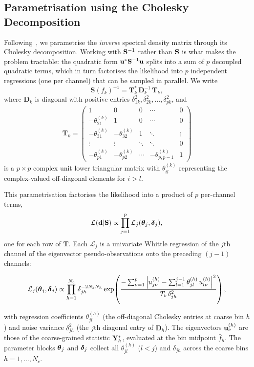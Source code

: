 \documentclass[%
	reprint,
	nofootinbib,
	amsmath,
	amssymb,
	aps,
]{revtex4-2}
\begin{document}
	\subsection{Parametrisation using the Cholesky Decomposition}
	Following~\citet{RosenOri2007Aeom,Hu2023}, we parametrise the
	\emph{inverse} spectral density matrix through its Cholesky decomposition.
	Working with $\S^{-1}$ rather than $\S$ is what makes the problem
	tractable: the quadratic form $\u^{*}\S^{-1}\u$ splits into a sum of $p$
	decoupled quadratic terms, which in turn factorises the likelihood into
	$p$ independent regressions (one per channel) that can be sampled in
	parallel. We write
	\begin{equation}
		\mathbf{S}(f_{k})^{-1}= \mathbf{T}_{k}^{*} \, \mathbf{D}_{k}^{-1}\, \mathbf{T}_{k},
	\end{equation}
	where $\mathbf{D}_{k}$ is diagonal with positive entries
	$\delta_{1k}^{2}, \delta_{2k}^{2}, \ldots, \delta_{pk}^{2}$, and
	\begin{align}
		\mathbf{T}_{k} = \begin{pmatrix}1&0&0&\cdots&0 \\ -\theta_{21}^{(k)}&1&0&\cdots&0 \\ -\theta_{31}^{(k)}&-\theta_{32}^{(k)}&1&\ddots&\vdots \\ \vdots&\vdots&\ddots&\ddots&0 \\ -\theta_{p1}^{(k)}&-\theta_{p2}^{(k)}&\cdots&-\theta_{p,p-1}^{(k)}&1\end{pmatrix}
	\end{align}
	is a $p \times p$ complex unit lower triangular matrix with
	$\theta_{il}^{(k)}$ representing the complex-valued off-diagonal elements for
	$i > l$.

	This parametrisation factorises the likelihood into a product of $p$
	per-channel terms,
	\begin{equation}
		\mathcal{L}(\d|\S) \propto \prod_{j=1}^{p}\mathcal{L}_{j}(\btheta_{j},\bdelta_{j}),
		\label{eq:likelihood}
	\end{equation}
	one for each row of $\mathbf{T}$. Each $\mathcal{L}_{j}$ is a
	univariate Whittle regression of the $j$th channel of the eigenvector
	pseudo-observations onto the preceding $(j-1)$ channels:
	\begin{widetext}
	\begin{equation}
		\label{eq:likelihoodj}
		\mathcal{L}_{j}(\btheta_{j},\bdelta_{j}) \propto
		\prod_{h=1}^{N_{c}} \delta_{jh}^{-2N_{b}N_{h}}
		\exp\!\left(\frac{-\sum_{\nu=1}^{p}\left|u_{j\nu}^{(h)}-\sum_{l=1}^{j-1}\theta_{jl}^{(h)}\,u_{l\nu}^{(h)}\right|^{2}}
		              {T_{b}\,\delta_{jh}^{2}}\right),
	\end{equation}
	\end{widetext}%
	with regression coefficients $\theta_{jl}^{(h)}$ (the off-diagonal
	Cholesky entries at coarse bin $h$) and noise variance
	$\delta_{jh}^{2}$ (the $j$th diagonal entry of $\mathbf{D}_{h}$).
	The eigenvectors $\u_{\nu}^{(h)}$ are those of the coarse-grained
	statistic $\Y_{h}^{*}$, evaluated at the bin midpoint $\bar f_{h}$.
	The parameter blocks $\btheta_{j}$ and $\bdelta_{j}$ collect all
	$\theta_{jl}^{(h)}$ ($l<j$) and $\delta_{jh}$ across the coarse bins
	$h=1,\ldots,N_{c}$.
\end{document}
